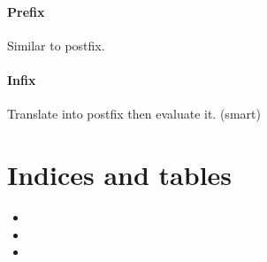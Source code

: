 \documentclass[letterpaper,10pt,english]{sphinxmanual}
\begin{document}
\subsubsection{Prefix}
\label{topics/evaluation:id2}
Similar to postfix.


\subsubsection{Infix}
\label{topics/evaluation:id3}
Translate into postfix then evaluate it. (smart)


\chapter{Indices and tables}
\label{index:indices-and-tables}\begin{itemize}
\item {} 

\item {} 

\item {} 

\end{itemize}



\renewcommand{\indexname}{Index}
\printindex
\end{document}
